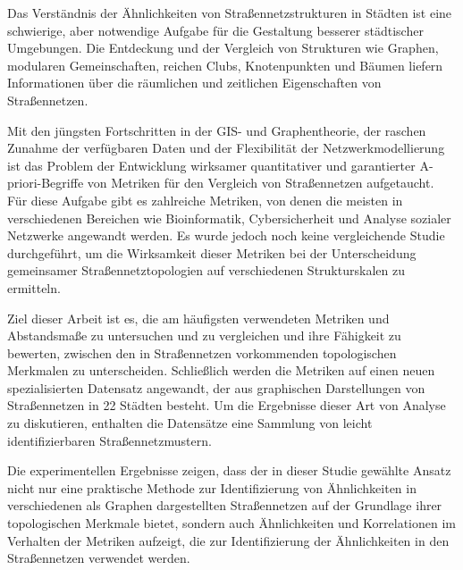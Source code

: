 
Das Verständnis der Ähnlichkeiten von Straßennetzstrukturen in Städten ist eine schwierige, aber notwendige Aufgabe für die Gestaltung besserer städtischer Umgebungen. Die Entdeckung und der Vergleich von Strukturen wie Graphen, modularen Gemeinschaften, reichen Clubs, Knotenpunkten und Bäumen liefern Informationen über die räumlichen und zeitlichen Eigenschaften von Straßennetzen.

Mit den jüngsten Fortschritten in der GIS- und Graphentheorie, der raschen Zunahme der verfügbaren Daten und der Flexibilität der Netzwerkmodellierung ist das Problem der Entwicklung wirksamer quantitativer und garantierter A-priori-Begriffe von Metriken für den Vergleich von Straßennetzen aufgetaucht. Für diese Aufgabe gibt es zahlreiche Metriken, von denen die meisten in verschiedenen Bereichen wie Bioinformatik, Cybersicherheit und Analyse sozialer Netzwerke angewandt werden. Es wurde jedoch noch keine vergleichende Studie durchgeführt, um die Wirksamkeit dieser Metriken bei der Unterscheidung gemeinsamer Straßennetztopologien auf verschiedenen Strukturskalen zu ermitteln.

Ziel dieser Arbeit ist es, die am häufigsten verwendeten Metriken und Abstandsmaße zu untersuchen und zu vergleichen und ihre Fähigkeit zu bewerten, zwischen den in Straßennetzen vorkommenden topologischen Merkmalen zu unterscheiden. Schließlich werden die Metriken auf einen neuen spezialisierten Datensatz angewandt, der aus graphischen Darstellungen von Straßennetzen in 22 Städten besteht. Um die Ergebnisse dieser Art von Analyse zu diskutieren, enthalten die Datensätze eine Sammlung von leicht identifizierbaren Straßennetzmustern.

Die experimentellen Ergebnisse zeigen, dass der in dieser Studie gewählte Ansatz nicht nur eine praktische Methode zur Identifizierung von Ähnlichkeiten in verschiedenen als Graphen dargestellten Straßennetzen auf der Grundlage ihrer topologischen Merkmale bietet, sondern auch Ähnlichkeiten und Korrelationen im Verhalten der Metriken aufzeigt, die zur Identifizierung der Ähnlichkeiten in den Straßennetzen verwendet werden.
